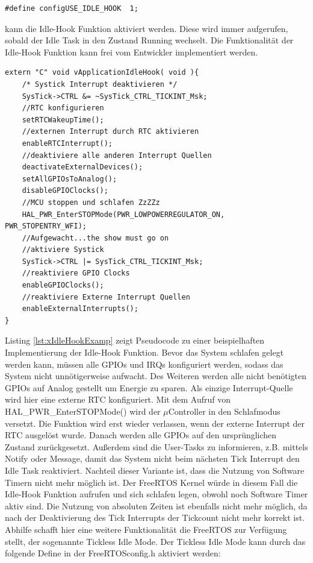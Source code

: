 \begin{lstlisting}[label=lst:defineIdleHook, numbers = none]
#define configUSE_IDLE_HOOK  1; 
\end{lstlisting}
kann die Idle-Hook Funktion aktiviert werden. Diese wird immer aufgerufen, sobald der Idle Task in den Zustand Running wechselt. Die Funktionalität der Idle-Hook Funktion kann frei vom Entwickler implementiert werden. 
\begin{lstlisting}[caption={Pseudocode für eine Idle-Hook Funktion.},captionpos=b, label=lst:xIdleHookExamp, float=hbt!]
extern "C" void vApplicationIdleHook( void ){
	/* Systick Interrupt deaktivieren */
	SysTick->CTRL &= ~SysTick_CTRL_TICKINT_Msk;
	//RTC konfigurieren
	setRTCWakeupTime();
	//externen Interrupt durch RTC aktivieren
	enableRTCInterrupt();
	//deaktiviere alle anderen Interrupt Quellen
	deactivateExternalDevices();
	setAllGPIOsToAnalog(); 
	disableGPIOClocks();
	//MCU stoppen und schlafen ZzZZz
	HAL_PWR_EnterSTOPMode(PWR_LOWPOWERREGULATOR_ON, PWR_STOPENTRY_WFI); 
	//Aufgewacht...the show must go on
	//aktiviere Systick
	SysTick->CTRL |= SysTick_CTRL_TICKINT_Msk;
	//reaktiviere GPIO Clocks
	enableGPIOClocks();
	//reaktiviere Externe Interrupt Quellen
	enableExternalInterrupts();	
}
\end{lstlisting}
\newline  %
Listing \ref{lst:xIdleHookExamp} zeigt Pseudocode zu einer beispielhaften Implementierung der Idle-Hook Funktion. Bevor das System schlafen gelegt werden kann, müssen alle GPIOs und IRQs konfiguriert werden, sodass das System nicht unnötigerweise aufwacht. Des Weiteren werden alle nicht benötigten GPIOs auf Analog gestellt um Energie zu sparen. Als einzige Interrupt-Quelle wird hier eine externe RTC konfiguriert. Mit dem Aufruf von HAL\_PWR\_EnterSTOPMode() wird der $\mu$Controller in den Schlafmodus versetzt. Die Funktion wird erst wieder verlassen, wenn der externe Interrupt der RTC ausgelöst wurde. Danach werden alle GPIOs auf den ursprünglichen Zustand zurückgesetzt. Außerdem sind die User-Tasks zu informieren, z.B. mittels Notify oder Message, damit das System nicht beim nächsten Tick Interrupt den Idle Task reaktiviert. Nachteil dieser Variante ist, dass die Nutzung von Software Timern nicht mehr möglich ist. Der FreeRTOS Kernel würde in diesem Fall die Idle-Hook Funktion aufrufen und sich schlafen legen, obwohl noch Software Timer aktiv sind. Die Nutzung von absoluten Zeiten ist ebenfalls nicht mehr möglich, da nach der Deaktivierung des Tick Interrupts der Tickcount nicht mehr korrekt ist. Abhilfe schafft hier eine weitere Funktionalität die FreeRTOS zur Verfügung stellt, der sogenannte Tickless Idle Mode. Der Tickless Idle Mode kann durch das folgende Define in der FreeRTOSconfig.h aktiviert werden:  

